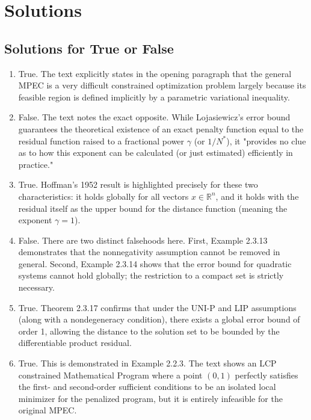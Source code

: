 \documentclass[pdflatex,sn-mathphys-num]{sn-jnl}%
\theoremstyle{definition}
\begin{document}
\section{Solutions}
\subsection{Solutions for True or False}
\begin{enumerate}
    \item True. The text explicitly states in the opening paragraph that the general MPEC is a very difficult constrained optimization problem largely because its feasible region is defined implicitly by a parametric variational inequality.

\item False. The text notes the exact opposite. While Lojasiewicz's error bound guarantees the theoretical existence of an exact penalty function equal to the residual function raised to a fractional power $\gamma$ (or $1/N^*$), it "provides no clue as to how this exponent can be calculated (or just estimated) efficiently in practice."

\item True. Hoffman's 1952 result is highlighted precisely for these two characteristics: it holds globally for all vectors $x \in \mathbb{R}^n$, and it holds with the residual itself as the upper bound for the distance function (meaning the exponent $\gamma = 1$).

\item False. There are two distinct falsehoods here. First, Example 2.3.13 demonstrates that the nonnegativity assumption cannot be removed in general. Second, Example 2.3.14 shows that the error bound for quadratic systems cannot hold globally; the restriction to a compact set is strictly necessary.

\item True. Theorem 2.3.17 confirms that under the UNI-P and LIP assumptions (along with a nondegeneracy condition), there exists a global error bound of order 1, allowing the distance to the solution set to be bounded by the differentiable product residual.

\item True. This is demonstrated in Example 2.2.3. The text shows an LCP constrained Mathematical Program where a point $(0,1)$ perfectly satisfies the first- and second-order sufficient conditions to be an isolated local minimizer for the penalized program, but it is entirely infeasible for the original MPEC.
\end{enumerate}
\end{document}

